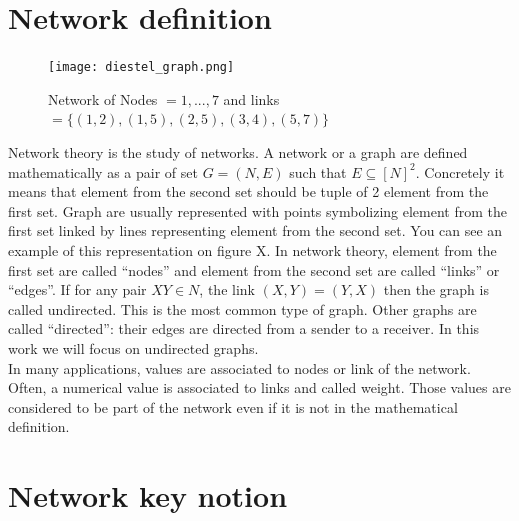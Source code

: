 \documentclass[a4paper, 12pt]{report}
\begin{document}
\section{Network definition}
\begin{figure}
\centering
\texttt{[image: diestel\_graph.png]}
\caption{Network of Nodes $= 1,...,7$ and links $= \{(1, 2), (1, 5), (2, 5), (3, 4), (5, 7)\}$  \citep{diestel}}
\label{diestel graph}
\end{figure}

Network theory is the study of networks. A  network or a graph are defined mathematically as a pair of set $G = (N, E)$ such that $E  \subseteq [N ]^2$. Concretely it means that element from the second set should be tuple of 2 element from the first set.
Graph are usually represented with points symbolizing element from the first set linked by lines representing element from the second set. You can see an example of this representation on figure X. In network theory, element from the first set are called ``nodes'' and element from the second set are called ``links'' or ``edges''. If for any pair $XY \in N$,  the link $(X,Y) = (Y,X)$ then the graph is called undirected. This is the most common type of graph. Other graphs are called ``directed'': their edges are directed from a sender to a receiver. In this work we will focus on undirected graphs. \citep{diestel}\\

In many applications, values are associated to nodes or link of the network. Often, a numerical value is associated to links and called weight. Those values are considered to be part of the network even if it is not in the mathematical definition. 


\section{Network key notion}
\end{document}

